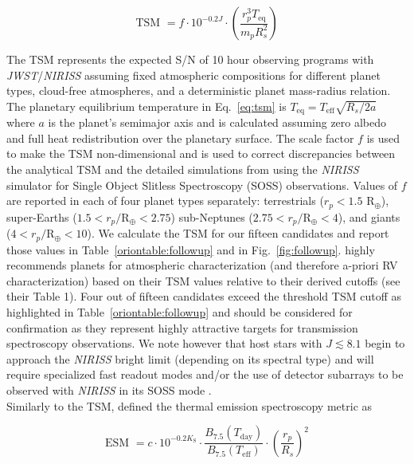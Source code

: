 \begin{equation}
  \text{TSM } = f \cdot 10^{-0.2J} \cdot \left( \frac{r_p^3 T_{\text{eq}}}{m_p R_s^2} \right)
  \label{eq:tsm}
\end{equation}

\noindent The TSM represents the expected S/N of 10 hour observing programs with \emph{JWST}/\emph{NIRISS}
assuming fixed atmospheric compositions for different planet types, cloud-free atmospheres, and a
deterministic planet mass-radius relation. The planetary equilibrium temperature in Eq.~\ref{eq:tsm}
is $T_{\text{eq}} = T_{\text{eff}} \sqrt{R_s/2a}$ where $a$ is the planet's semimajor axis and is calculated
assuming zero albedo and full heat redistribution over the planetary surface. The scale factor $f$ is
used to make the TSM non-dimensional and is used to correct discrepancies between the analytical TSM
and the detailed simulations from \cite{louie18} using the \emph{NIRISS} simulator for Single Object
Slitless Spectroscopy (SOSS) observations. Values of $f$ are reported in \cite{kempton18} each of four
planet types separately: terrestrials ($r_p < 1.5$ R$_{\oplus}$), super-Earths ($1.5 < r_p/\text{R}_{\oplus} < 2.75$) 
sub-Neptunes ($2.75 < r_p/\text{R}_{\oplus} < 4$), and giants ($4 < r_p/\text{R}_{\oplus} < 10$). 
We calculate the TSM for our fifteen candidates and report those values in Table~\ref{oriontable:followup} and in
Fig.~\ref{fig:followup}. \cite{kempton18} highly recommends planets for atmospheric characterization
(and therefore a-priori RV characterization) based on their TSM values relative to their derived cutoffs (see
their Table 1). Four out of fifteen candidates exceed the threshold TSM cutoff as highlighted in Table~\ref{oriontable:followup}
and should be considered for confirmation as they represent highly attractive targets for transmission spectroscopy
observations. We note however that host stars with $J\lesssim 8.1$ begin to approach the \emph{NIRISS}
bright limit (depending on its spectral type) and will require specialized fast readout modes and/or the use
of detector subarrays to be observed with \emph{NIRISS} in its SOSS mode \citep{beichman14}. \\

Similarly to the TSM, \cite{kempton18} defined the thermal emission spectroscopy metric as

\begin{equation}
  \text{ESM } = c \cdot 10^{-0.2K_{\text{S}}} \cdot \frac{B_{7.5}(T_{\text{day}})}{B_{7.5}(T_{\text{eff}})} \cdot
  \left( \frac{r_p}{R_s} \right)^2
\end{equation}

